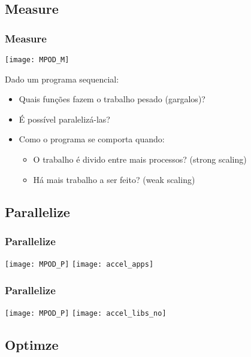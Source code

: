 \documentclass[10pt, compress, aspectratio=43, xcolor={table,usenames,dvipsnames}]{beamer}
\begin{document}
\subsection{Measure}

\begin{frame}
    \frametitle{Measure}
    \begin{center}
    \texttt{[image: MPOD\_M]}
    \end{center}
    \vfill

    Dado um \alert{programa sequencial}:
    \begin{itemize}
        \item Quais funções fazem o \alert{trabalho pesado} (\alert{gargalos})?
        \item É possível \alert{paralelizá-las}?
        \item Como o programa se comporta quando:
            \begin{itemize}
                \item O trabalho é divido entre mais processos? (\alert{strong scaling})
                \item Há mais trabalho a ser feito? (\alert{weak scaling})
            \end{itemize}
    \end{itemize}
\end{frame}

\subsection{Parallelize}

\begin{frame}
    \frametitle{Parallelize}
    \begin{center}
    \texttt{[image: MPOD\_P]}
    \vfill
    \texttt{[image: accel\_apps]}
    \end{center}
\end{frame}

\begin{frame}
    \frametitle{Parallelize}
    \begin{center}
    \texttt{[image: MPOD\_P]}
    \vfill
    \texttt{[image: accel\_libs\_no]}
    \end{center}
\end{frame}

\subsection{Optimze}
\end{document}
